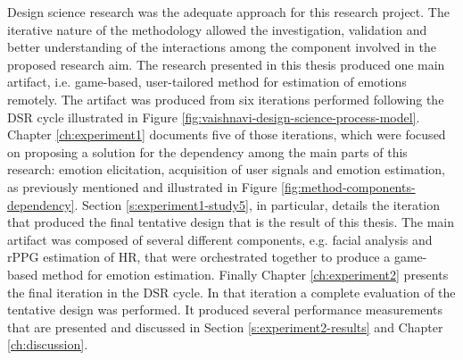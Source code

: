Design science research was the adequate approach for this research project. The iterative nature of the methodology allowed the investigation, validation and better understanding of the interactions among the component involved in the proposed research aim. The research presented in this thesis produced one main artifact, i.e. game-based, user-tailored method for estimation of emotions remotely. The artifact was produced from six iterations performed following the DSR cycle illustrated in Figure \ref{fig:vaishnavi-design-science-process-model}. Chapter \ref{ch:experiment1} documents five of those iterations, which were focused on proposing a solution for the dependency among the main parts of this research: emotion elicitation, acquisition of user signals and emotion estimation, as previously mentioned and illustrated in Figure \ref{fig:method-components-dependency}. Section \ref{s:experiment1-study5}, in particular, details the iteration that produced the final tentative design that is the result of this thesis. The main artifact was composed of several different components, e.g. facial analysis and rPPG estimation of HR, that were orchestrated together to produce a game-based method for emotion estimation. Finally Chapter \ref{ch:experiment2} presents the final iteration in the DSR cycle. In that iteration a complete evaluation of the tentative design was performed. It produced several performance measurements that are presented and discussed in Section \ref{s:experiment2-results} and Chapter \ref{ch:discussion}.




